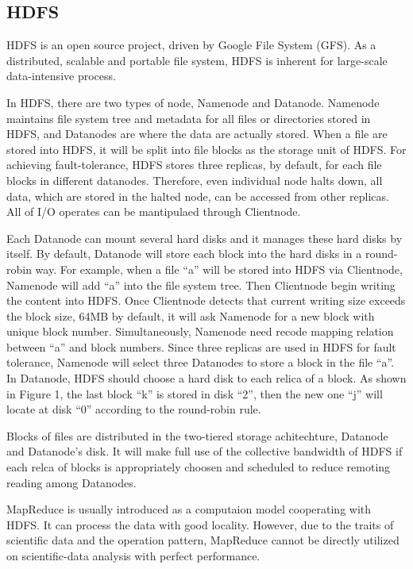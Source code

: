 \documentclass[preprint,12pt]{elsarticle}
\begin{document}
\subsection{HDFS}
HDFS\cite{borthakur2008hdfs} is an open source project, driven by Google File System (GFS)\cite{ghemawat2003google}. As a distributed, 
scalable and portable file system, HDFS is inherent for large-scale data-intensive process. \par
In HDFS, there are two types of node, Namenode and Datanode. Namenode maintains file system tree and metadata for all files or
directories stored in HDFS, and Datanodes are where the data are actually stored. When a file are stored into HDFS, it will be
split into file blocks as the storage unit of HDFS. For achieving fault-tolerance, HDFS stores three replicas, by default, for each
file blocks in different datanodes. Therefore, even individual node halts down, all data, which are stored in the halted node, can
be accessed from other replicas. All of I/O operates can be mantipulaed through Clientnode. \par
Each Datanode can mount several hard disks and it manages these hard disks by itself. By default, Datanode will store each block
into the hard disks in a round-robin way. For example, when a file ``a'' will be stored into HDFS via Clientnode, Namenode will add
``a'' into the file system tree. Then Clientnode begin writing the content into HDFS. Once Clientnode detects that current writing
size exceeds the block size, 64MB by default, it will ask Namenode for a new block with unique block number. Simultaneously,
Namenode need recode mapping relation between ``a'' and block numbers. Since three replicas are used in HDFS for fault tolerance,
Namenode will select three Datanodes to store a block in the file ``a''. In Datanode, HDFS should choose a hard disk to each relica 
of a block. As shown in Figure 1, the last block ``k'' is stored in disk ``2'', then the new one ``j'' will locate at disk ``0'' 
according to the round-robin rule. \par

\begin{figure}
\centering

\end{figure}

Blocks of files are distributed in the two-tiered storage achitechture, Datanode and Datanode's disk. It will make full use of the
collective bandwidth of HDFS if each relca of blocks is appropriately choosen and scheduled to reduce remoting reading among
Datanodes. \par
MapReduce is usually introduced as a computaion model cooperating with HDFS. It can process the data with good locality.
However, due to the traits of scientific data and the operation pattern, MapReduce cannot be directly utilized on scientific-data
analysis with perfect performance.
\end{document}

